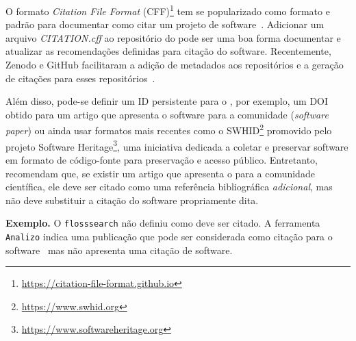 
%
O formato \textit{Citation File Format} (CFF)\footnote{\url{https://citation-file-format.github.io}} tem se popularizado como formato e padrão para documentar como citar um projeto de software~\cite{druskat:2021}.
%
Adicionar um arquivo {\em CITATION.cff} ao repositório do \RSw pode ser uma boa forma documentar e atualizar as recomendações definidas para citação do software. 
Recentemente, Zenodo e GitHub facilitaram a adição de metadados aos repositórios e a geração de citações para esses 
repositórios~\cite{smith:2021}. 

Além disso, pode-se definir um ID persistente para o \RS, por exemplo, um DOI obtido para um artigo que apresenta o software para a comunidade (\textit{software paper}) ou ainda usar formatos mais recentes como o SWHID\footnote{\url{https://www.swhid.org}} promovido pelo projeto Software Heritage\footnote{\url{https://www.softwareheritage.org}}, uma iniciativa dedicada a coletar e preservar software em formato de código-fonte para preservação e acesso público.
%
Entretanto, \cite{katz:citation:format} recomendam que, se existir um artigo que apresenta o \RSw para a comunidade científica, ele deve ser citado como uma referência bibliográfica \textit{adicional}, mas não deve substituir a citação do software propriamente dita.

\noindent\textbf{Exemplo.} 
O \RSw \texttt{flosssearch} não definiu como deve ser citado. 
A ferramenta \texttt{Analizo} indica uma publicação que pode ser considerada como citação para o software~\cite{analizo2010} mas não apresenta uma citação de software.


